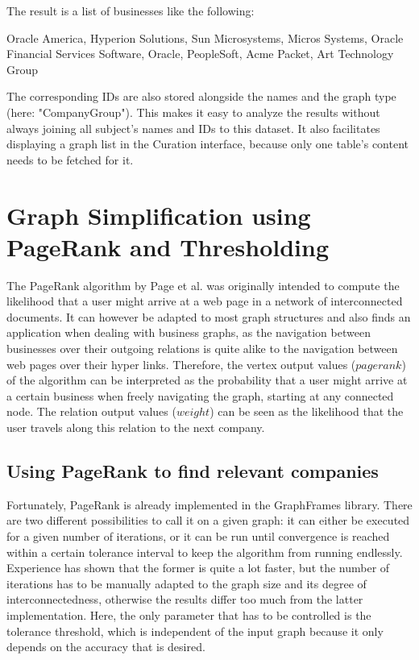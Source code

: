 \documentclass[
        a4paper,     %
        titlepage,   %
        oneside,     %
        parskip      %
        ]{scrartcl}  %
\begin{document}
  The result is a list of businesses like the following:

  Oracle America, Hyperion Solutions, Sun Microsystems, Micros Systems, Oracle Financial Services Software, Oracle, PeopleSoft, Acme Packet, Art Technology Group

  The corresponding IDs are also stored alongside the names and the graph type (here: "CompanyGroup"). This makes it easy to analyze
  the results without always joining all subject's names and IDs to this dataset. It also facilitates displaying
  a graph list in the Curation interface, because only one table's content needs to be fetched for it.
  \pagebreak

  \section{Graph Simplification using PageRank and Thresholding}
  The PageRank algorithm by Page et al. \cite{pagerank1999} was originally intended
  to compute the likelihood that a user might arrive at a web page
  in a network of interconnected documents. It can however be adapted to most
  graph structures and also finds an application when dealing with business graphs,
  as the navigation between businesses over their outgoing relations is quite
  alike to the navigation between web pages over their hyper links.
  Therefore, the vertex output values ($pagerank$) of the algorithm can be interpreted as the
  probability that a user might arrive at a certain business when freely
  navigating the graph, starting at any connected node.
  The relation output values ($weight$) can be seen as the likelihood that the user
  travels along this relation to the next company.

  \subsection{Using PageRank to find relevant companies}
  Fortunately, PageRank is already implemented in the GraphFrames library.
  There are two different possibilities to call it on a given graph: it can either
  be executed for a given number of iterations, or it can be run until convergence
  is reached within a certain tolerance interval to keep the algorithm from running endlessly.
  Experience has shown that the former is quite a lot faster, but the number of iterations
  has to be manually adapted to the graph size and its degree of interconnectedness,
  otherwise the results differ too much from the latter implementation.
  Here, the only parameter that has to be controlled is the tolerance threshold,
  which is independent of the input graph because it only depends on the accuracy that is desired.
\end{document}
